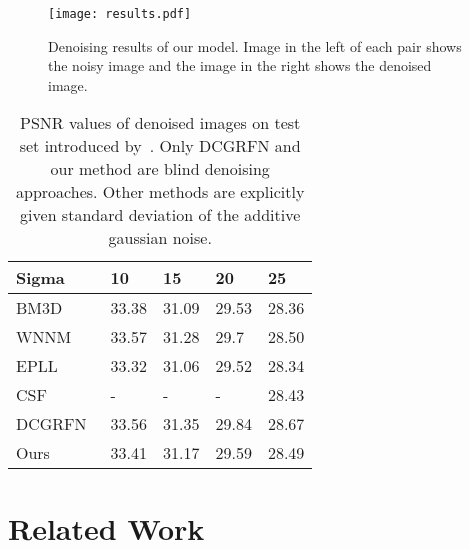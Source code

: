 \documentclass[10pt,twocolumn,letterpaper]{proc}
\begin{document}
\begin{figure*}[thbp]
\begin{center}
    \texttt{[image: results.pdf]}
\caption{Denoising results of our model. Image in the left of each pair shows the noisy image and the image in the right shows the denoised image.}
\label{default}
\end{center}
\end{figure*}

\begin{table}[ht]

\caption{PSNR values of denoised images on test set introduced by~\cite{Vemulapalli_2016_CVPR}. Only DCGRFN\cite{Vemulapalli_2016_CVPR} and our method are blind denoising approaches. Other methods are explicitly given standard deviation of the additive gaussian noise.}
\begin{center}
\begin{tabular}{lllll}
\hline
Sigma                             & 10    & 15    & 20    & 25    \\\hline
BM3D~\cite{dabov2009bm3d}          & 33.38 & 31.09 & 29.53 & 28.36 \\
WNNM~\cite{gu2014weighted}         & 33.57 & 31.28 & 29.7  & 28.50 \\
EPLL~\cite{zoran2011learning}      & 33.32 & 31.06 & 29.52 & 28.34 \\
CSF~\cite{schmidt2014shrinkage}    &  -   &  -    &   -   & 28.43 \\
DCGRFN~\cite{Vemulapalli_2016_CVPR}& 33.56 & 31.35 & 29.84 & 28.67 \\\hline
Ours                              & 33.41 & 31.17 & 29.59 & 28.49 \\
\hline
\end{tabular}
\end{center}
\label{tab:comparison}
\end{table}


    
\section{Related Work}\label{sec:related}
%        
\end{document}
